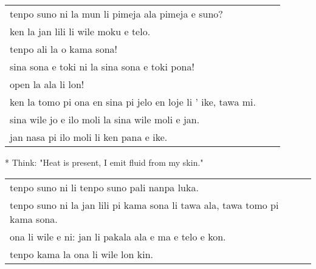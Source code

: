 \begin{supertabular}{p{5,5cm}|ll}
    tenpo suno ni la mun li pimeja ala pimeja e suno?             &  & \\
    ken la jan lili li wile moku e telo.                          &  & \\
    tenpo ali la o kama sona!                                     &  & \\
    sina sona e toki ni la sina sona e toki pona!                 &  & \\
    open la ala li lon!                                           &  & \\
    ken la tomo pi ona en sina pi jelo en loje li ' ike, tawa mi. &  & \\
    sina wile jo e ilo moli la sina wile moli e jan.              &  & \\
    jan nasa pi ilo moli li ken pana e ike.                       &  & \\
\end{supertabular}

* Think: "Heat is present, I emit fluid from my skin."

\begin{supertabular}{p{5,5cm}|ll}
    tenpo suno ni li tenpo suno pali nanpa luka.                                &  & \\
    tenpo suno ni la jan lili pi kama sona li tawa ala, tawa tomo pi kama sona. &  & \\
    ona li wile e ni: jan li pakala ala e ma e telo e kon.                      &  & \\
    tenpo kama la ona li wile lon kin.                                          &  & \\
\end{supertabular}
